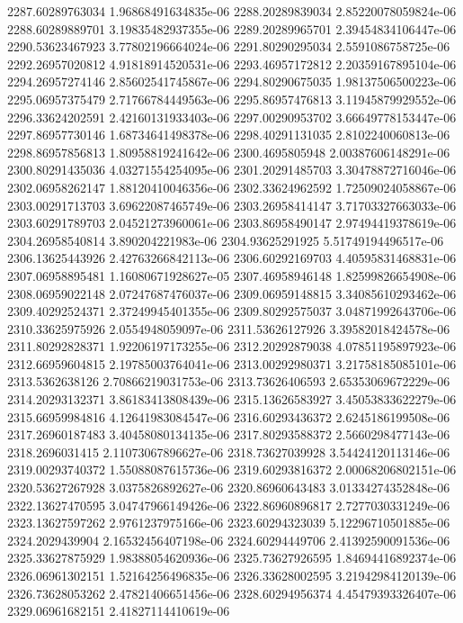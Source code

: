 {2287.60289763034 1.96868491634835e-06
2288.20289839034 2.85220078059824e-06
2288.60289889701 3.19835482937355e-06
2289.20289965701 2.39454834106447e-06
2290.53623467923 3.77802196664024e-06
2291.80290295034 2.5591086758725e-06
2292.26957020812 4.91818914520531e-06
2293.46957172812 2.20359167895104e-06
2294.26957274146 2.85602541745867e-06
2294.80290675035 1.98137506500223e-06
2295.06957375479 2.71766784449563e-06
2295.86957476813 3.11945879929552e-06
2296.33624202591 2.42160131933403e-06
2297.00290953702 3.66649778153447e-06
2297.86957730146 1.68734641498378e-06
2298.40291131035 2.8102240060813e-06
2298.86957856813 1.80958819241642e-06
2300.4695805948 2.00387606148291e-06
2300.80291435036 4.03271554254095e-06
2301.20291485703 3.30478872716046e-06
2302.06958262147 1.88120410046356e-06
2302.33624962592 1.72509024058867e-06
2303.00291713703 3.69622087465749e-06
2303.26958414147 3.71703327663033e-06
2303.60291789703 2.04521273960061e-06
2303.86958490147 2.97494419378619e-06
2304.26958540814 3.890204221983e-06
2304.93625291925 5.51749194496517e-06
2306.13625443926 2.42763266842113e-06
2306.60292169703 4.40595831468831e-06
2307.06958895481 1.16080671928627e-05
2307.46958946148 1.82599826654908e-06
2308.06959022148 2.07247687476037e-06
2309.06959148815 3.34085610293462e-06
2309.40292524371 2.37249945401355e-06
2309.80292575037 3.04871992643706e-06
2310.33625975926 2.0554948059097e-06
2311.53626127926 3.39582018424578e-06
2311.80292828371 1.92206197173255e-06
2312.20292879038 4.07851195897923e-06
2312.66959604815 2.19785003764041e-06
2313.00292980371 3.21758185085101e-06
2313.5362638126 2.70866219031753e-06
2313.73626406593 2.65353069672229e-06
2314.20293132371 3.86183413808439e-06
2315.13626583927 3.45053833622279e-06
2315.66959984816 4.12641983084547e-06
2316.60293436372 2.6245186199508e-06
2317.26960187483 3.40458080134135e-06
2317.80293588372 2.5660298477143e-06
2318.2696031415 2.11073067896627e-06
2318.73627039928 3.54424120113146e-06
2319.00293740372 1.55088087615736e-06
2319.60293816372 2.00068206802151e-06
2320.53627267928 3.0375826892627e-06
2320.86960643483 3.01334274352848e-06
2322.13627470595 3.04747966149426e-06
2322.86960896817 2.7277030331249e-06
2323.13627597262 2.9761237975166e-06
2323.60294323039 5.12296710501885e-06
2324.2029439904 2.16532456407198e-06
2324.60294449706 2.41392590091536e-06
2325.33627875929 1.98388054620936e-06
2325.73627926595 1.84694416892374e-06
2326.06961302151 1.52164256496835e-06
2326.33628002595 3.21942984120139e-06
2326.73628053262 2.47821406651456e-06
2328.60294956374 4.45479393326407e-06
2329.06961682151 2.41827114410619e-06
}
